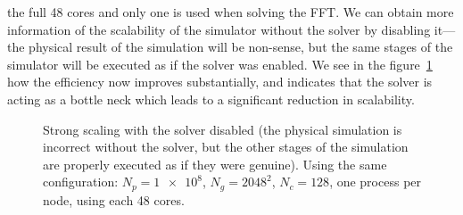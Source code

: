the full 48 cores and only one is used when solving the FFT. We can obtain more 
information of the scalability of the simulator without the solver by disabling 
it---the physical result of the simulation will be non-sense, but the same 
stages of the simulator will be executed as if the solver was enabled. We see in 
the figure~\ref{fig:strong-scaling-without-solver} how the efficiency now 
improves substantially, and indicates that the solver is acting as a bottle neck 
which leads to a significant reduction in scalability.
%
\begin{figure}[ht]%
\centering
{}
	\caption{Strong scaling with the solver disabled (the physical simulation is 
	incorrect without the solver, but the other stages of the simulation are 
	properly executed as if they were genuine).  Using the same configuration: 
	$N_p = \num{1e8}$, $N_g = 2048^2$,
	$N_c = 128$, one process per node, using each 48 cores.}
	\label{fig:strong-scaling-without-solver}
\end{figure}%
%

